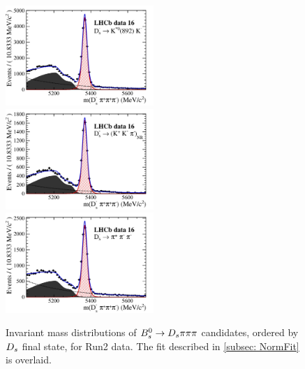 \begin{figure}[h]
\includegraphics[height=!,width=0.5\textwidth]{figs/norm_y16_KsK.pdf}
\includegraphics[height=!,width=0.5\textwidth]{figs/norm_y16_KKpi_NR.pdf}
\includegraphics[height=!,width=0.5\textwidth]{figs/norm_y16_pipipi.pdf}
\caption{Invariant mass distributions of ${{B}^0_{s}}\rightarrow{\ensuremath{{D}_{s}}}{\ensuremath{\pi}}{\ensuremath{\pi}}{\ensuremath{\pi}}$ candidates, ordered by ${{D}_{s}}$ final state, for Run2 data.
The fit described in \ref{subsec: NormFit} is overlaid.}
\label{fig:massfits_norm_Run2}
\end{figure}

\clearpage

